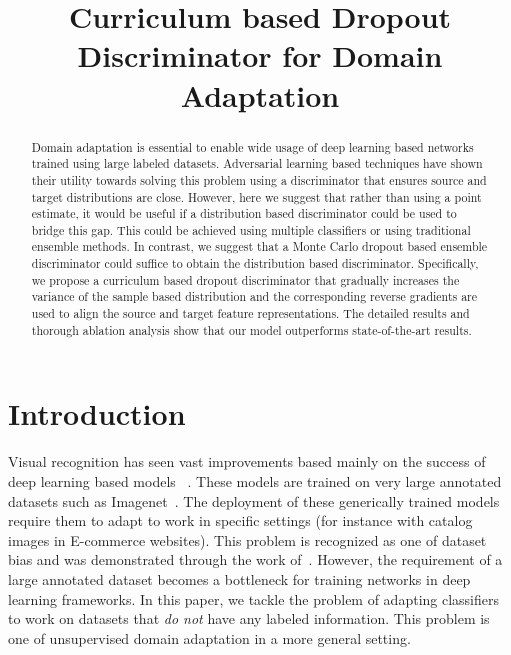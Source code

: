 \documentclass{bmvc2k}
\title{Curriculum based Dropout Discriminator for Domain Adaptation}
\begin{document}
\maketitle

\begin{abstract}
Domain adaptation is essential to enable wide usage of deep learning based networks trained using large labeled datasets. Adversarial learning based techniques have shown their utility towards solving this problem using a discriminator that ensures source and target distributions are close. However, here we suggest that rather than using a point estimate, it would be useful if a distribution based discriminator could be used to bridge this gap. This could be achieved using multiple classifiers or using  traditional ensemble methods. In contrast, we suggest that a Monte Carlo dropout based ensemble discriminator could suffice to obtain the distribution based discriminator. Specifically, we propose a curriculum based dropout discriminator that gradually increases the variance of the sample based distribution and the corresponding reverse gradients are used to align the source and target feature representations. The detailed results and thorough ablation analysis show that our model outperforms state-of-the-art results.
\end{abstract}

\section{Introduction}
Visual recognition has seen vast improvements based mainly on the success of deep learning based models ~\cite{krizhevsky_NIPS2012}. These models are trained on very large annotated datasets such as Imagenet~\cite{ILSVRC15}. The deployment of these generically trained models require them to adapt to work in specific settings (for instance with catalog images in E-commerce websites). This problem is recognized as one of dataset bias and was demonstrated through the work of~\cite{torralba_CVPR2011}. However, the requirement of a large annotated dataset becomes a bottleneck for training networks in deep learning frameworks. 
In this paper, we tackle the problem of adapting classifiers to work on datasets that \emph{do not} have any labeled information. This problem is one of unsupervised domain adaptation in a more general setting.
\end{document}
